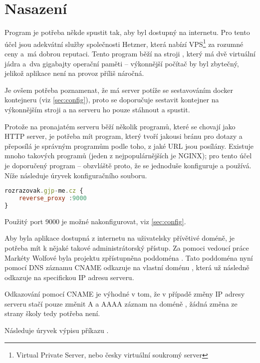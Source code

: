 \hypertarget{Technologie}{\chapter{Nasazení}}

\indent

Program je potřeba někde spustit tak, aby byl dostupný na internetu. Pro tento účel jsou adekvátní služby společnosti Hetzner, která nabízí VPS\footnote{Virtual Private Server, nebo česky virtuální soukromý server} za rozumné ceny a~má dobrou reputaci. Tento program běží na stroji , který má dvě virtuální jádra a~dva gigabajty operační paměti -- výkonnější počítač by byl zbytečný, jelikož aplikace není na provoz příliš náročná.

Je ovšem potřeba poznamenat, že má server potíže se sestavováním docker kontejneru (viz \ref{sec:config}), proto se doporučuje sestavit kontejner na výkonnějším stroji a na serveru ho pouze stáhnout a spustit. 

Protože na pronajatém serveru běží několik programů, které se chovají jako HTTP server, je potřeba mít program, který tvoří jakousi bránu pro dotazy a přeposílá je správným programům podle toho, z jaké URL jsou posílány. Existuje mnoho takových programů (jeden z nejpopulárnějších je NGINX); pro tento účel je doporučený program  -- obzvláště proto, že se jednoduše konfiguruje a používá. Níže následuje úryvek konfiguračního souboru. 

\begin{lstlisting}[language=JavaScript,caption={Úryvek konfiguračního souboru Caddy}]
rozrazovak.gjp-me.cz {
    reverse_proxy :9000
}
\end{lstlisting}

Použitý port 9000 je možné nakonfigurovat, viz \ref{sec:config}.

Aby byla aplikace dostupná z internetu na uživatelsky přívětivé doméně, je potřeba mít k nějaké takové administrátorský přístup. Za pomoci vedoucí práce Markéty Wolfové byla projektu zpřístupněna poddoména . Tato poddoména nyní pomocí DNS záznamu CNAME odkazuje na vlastní doménu , která už následně odkazuje na specifickou IP adresu serveru. 

Odkazování pomocí CNAME je výhodné v tom, že v případě změny IP adresy serveru stačí pouze změnit A a AAAA záznam na doméně , žádná změna ze strany školy tedy potřeba není.

\newpage

Následuje úryvek výpisu příkazu .


